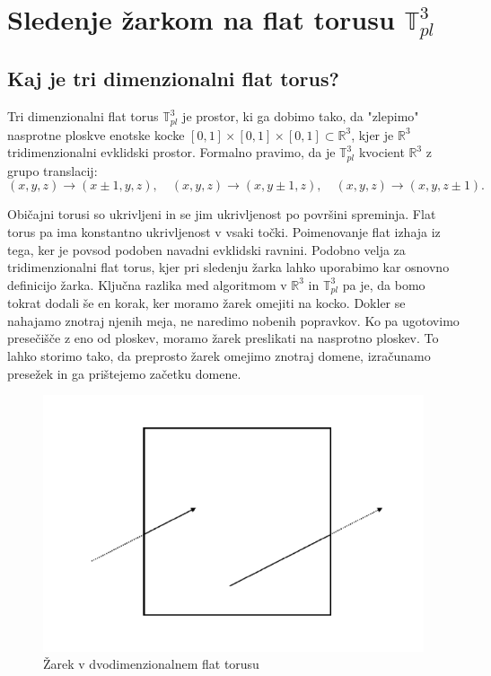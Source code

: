 \documentclass[titlepage]{article}
\begin{document}
\section{\texorpdfstring{Sledenje žarkom na flat torusu \( \mathbb{T}_{pl}^{3} \)}{Sledenje žarkom na flat torusu}}

\subsection{Kaj je tri dimenzionalni flat torus?}
Tri dimenzionalni flat torus \( \mathbb{T}^3_{pl} \) je prostor, ki ga dobimo tako, da "zlepimo" nasprotne ploskve enotske kocke \([0,1] \times [0,1] \times [0,1] \subset \mathbb{R}^3 \), kjer je \(\mathbb{R}^3\) tridimenzionalni evklidski prostor. Formalno pravimo, da je \( \mathbb{T}^3_{pl} \) kvocient \(\mathbb{R}^3\) z grupo translacij:
\[
(x, y, z) \to (x \pm 1, y, z), \quad (x, y, z) \to (x, y \pm 1, z), \quad (x, y, z) \to (x, y, z \pm 1).
\]

Običajni torusi so ukrivljeni in se jim ukrivljenost po površini spreminja. Flat torus pa ima konstantno ukrivljenost v vsaki točki. Poimenovanje flat izhaja iz tega, ker je povsod podoben navadni evklidski ravnini. Podobno velja za tridimenzionalni flat torus, kjer pri sledenju žarka lahko uporabimo kar osnovno definicijo žarka. Ključna razlika med algoritmom v \( \mathbb{R}^3 \) in \( \mathbb{T}^3_{pl} \) pa je, da bomo tokrat dodali še en korak, ker moramo žarek omejiti na kocko. Dokler se nahajamo znotraj njenih meja, ne naredimo nobenih popravkov. Ko pa ugotovimo presečišče z eno od ploskev, moramo žarek preslikati na nasprotno ploskev. To lahko storimo tako, da preprosto žarek omejimo znotraj domene, izračunamo presežek in ga prištejemo začetku domene.

\begin{figure}[H]
    \centering
    \includegraphics[width=0.5\linewidth]{Images/flat_torus_zrcaljenje.png}
    \caption{Žarek v dvodimenzionalnem flat torusu}
    \label{Slika:Žarek v dvodimenzionalnem flat torusu}
\end{figure}
\end{document}
